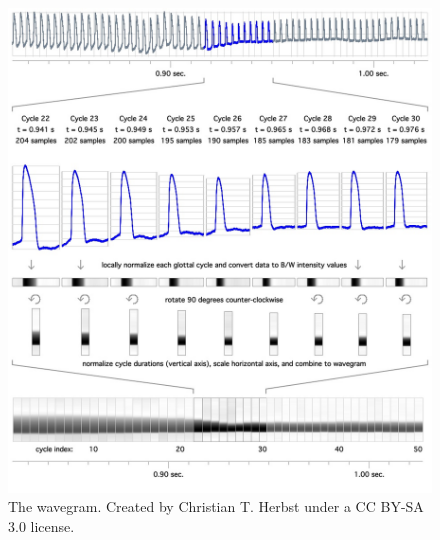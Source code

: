 \documentclass[
  11pt,
  a4paper,
]{article}
\begin{document}
\begin{figure}
  \centering
  \includegraphics{./img/wavegram.png}
  \caption{The wavegram. Created by Christian T. Herbst under a CC BY-SA 3.0 license.}
  \label{f:wavegram}
\end{figure}
\end{document}
